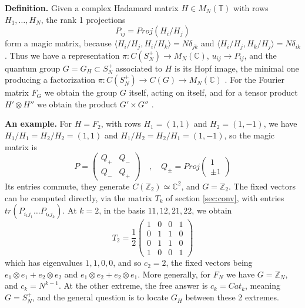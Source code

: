 \documentclass[11pt]{amsart}
\newcommand{\T}{\mathbb T}
\begin{document}
\noindent\textbf{Definition.} Given a complex Hadamard matrix $H\in M_N(\T)$ with rows $H_1,\ldots,H_N$, the rank 1 projections
$$P_{ij}=Proj(H_i/H_j)$$
form a magic matrix, because $\langle H_i/H_j,H_i/H_k\rangle=N\delta_{jk}$ and $\langle H_i/H_j,H_k/H_j\rangle=N\delta_{ik}$. Thus we have a representation $\pi:C(S_N^+)\to M_N(\mathbb C)$, $u_{ij}\to P_{ij}$, and the quantum group $G=G_H\subset S_N^+$ associated to $H$ is its Hopf image, the minimal one producing a factorization $\pi:C(S_N^+)\to C(G)\to M_N(\mathbb C)$ \cite{bb1,bbs}. For the Fourier matrix $F_G$ we obtain the group $G$ itself, acting on itself, and for a tensor product $H'\otimes H''$ we obtain the product $G'\times G''$ \cite[Theorem 14.5]{banicaHM}.

\medskip

\noindent\textbf{An example.} For $H=F_2$, with rows $H_1=(1,1)$ and $H_2=(1,-1)$, we have $H_1/H_1=H_2/H_2=(1,1)$ and $H_1/H_2=H_2/H_1=(1,-1)$, so the magic matrix is
$$P=\begin{pmatrix}Q_+&Q_-\\ Q_-&Q_+\end{pmatrix}\quad,\quad Q_\pm=Proj\left(\begin{matrix}1\\ \pm1\end{matrix}\right)$$
Its entries commute, they generate $C(\mathbb Z_2)\simeq\mathbb C^2$, and $G=\mathbb Z_2$. The fixed vectors can be computed directly, via the matrix $T_k$ of section \ref{sec:conv}, with entries $tr(P_{i_1j_1}\ldots P_{i_kj_k})$. At $k=2$, in the basis $11,12,21,22$, we obtain
$$T_2=\frac{1}{2}\begin{pmatrix}1&0&0&1\\0&1&1&0\\0&1&1&0\\1&0&0&1\end{pmatrix}$$
which has eigenvalues $1,1,0,0$, and so $c_2=2$, the fixed vectors being $e_1\otimes e_1+e_2\otimes e_2$ and $e_1\otimes e_2+e_2\otimes e_1$. More generally, for $F_N$ we have $G=\mathbb Z_N$, and $c_k=N^{k-1}$. At the other extreme, the free answer is $c_k=Cat_k$, meaning $G=S_N^+$, and the general question is to locate $G_H$ between these 2 extremes.

\medskip
\end{document}
